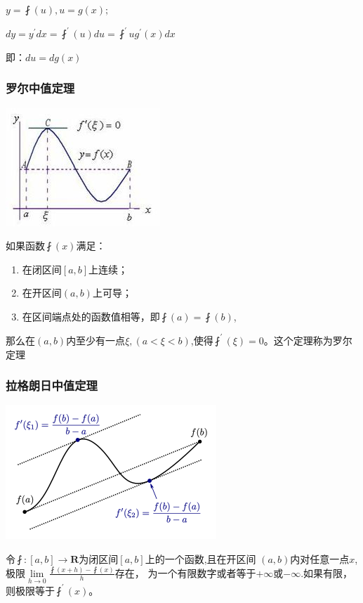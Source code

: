 \documentclass[UTF8]{ctexbook}
\newcommand{\limNormal}[1]{\lim\limits_{#1}}
\newcommand{\derivative}{^\prime}
\newcommand{\fDerivative}[1]{\fint\derivative(#1)}
\begin{document}
{{{{  $y = \fint(u), u = g(x);$

  $dy = y\derivative dx = \fint\derivative(u)du = \fint\derivative{u}g\derivative(x)dx$

  即：$du = dg(x)$
}%

\subsubsection{罗尔中值定理}{
  \includegraphics{resources/Rolle's_mean_value_theorem.jpg}

  如果函数$\fint(x)$满足：

  \begin{enumerate}
    \item 在闭区间$[a,b]$上连续；
    \item 在开区间$(a,b)$上可导；
    \item 在区间端点处的函数值相等，即$\fint(a) = \fint(b)$,
  \end{enumerate}

  那么在$(a,b)$内至少有一点$\xi, (a<\xi<b)$,使得$\fint\derivative(\xi) = 0$。这个定理称为罗尔定理
}%

\subsubsection{拉格朗日中值定理}{
\includegraphics{resources/Lagrange's_mean_value_theorem.png}

令$\fint : [a,b] \to \mathbf{R}$为闭区间$[a,b]$上的一个函数,且在开区间
$(a,b)$内对任意一点$x$,极限$\limNormal{h \to 0}\frac{\fint(x + h) - \fint(x)}{h}$存在，
为一个有限数字或者等于$+\infty$或$-\infty$.如果有限，则极限等于$\fDerivative{x}$。

}}}}
\end{document}
